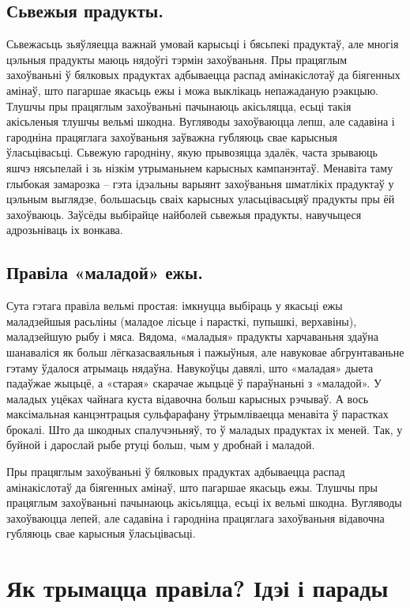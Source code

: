 \subsection{Сьвежыя прадукты.}
Сьвежасьць зьяўляецца важнай умовай карысьці і бясьпекі прадуктаў, але многія цэльныя прадукты маюць нядоўгі тэрмін захоўваньня. Пры працяглым захоўваньні ў бялковых прадуктах адбываецца распад амінакіслотаў да біягенных амінаў, што пагаршае якасьць ежы і можа выклікаць непажаданую рэакцыю. Тлушчы пры працяглым захоўваньні пачынаюць акісьляцца, есьці такія акісьленыя тлушчы вельмі шкодна. Вугляводы захоўваюцца лепш, але садавіна і гародніна працяглага захоўваньня заўважна губляюць свае карысныя ўласьцівасьці. Сьвежую гародніну, якую прывозяцца здалёк, часта зрываюць яшчэ нясьпелай і зь нізкім утрыманьнем карысных кампанэнтаў. Менавіта таму глыбокая замарозка – гэта ідэальны варыянт захоўваньня шматлікіх прадуктаў у цэльным выглядзе, большасьць сваіх карысных уласьцівасьцяў прадукты пры ёй захоўваюць. Заўсёды выбірайце найболей сьвежыя прадукты, навучыцеся адрозьніваць іх вонкава.

\subsection{Правіла «маладой» ежы.}
Сута гэтага правіла вельмі простая: імкнуцца выбіраць у якасьці ежы маладзейшыя расьліны (маладое лісьце і парасткі, пупышкі, верхавіны), маладзейшую рыбу і мяса. Вядома, «маладыя» прадукты харчаваньня здаўна шанаваліся як больш лёгказасваяльныя і пажыўныя, але навуковае абгрунтаваньне гэтаму ўдалося атрымаць нядаўна. Навукоўцы давялі, што «маладая» дыета падаўжае жыцьцё, а «старая» скарачае жыцьцё ў параўнаньні з «маладой». У маладых уцёках чайнага куста відавочна больш карысных рэчываў. А вось максімальная канцэнтрацыя сульфарафану ўтрымліваецца менавіта ў парастках брокалі. Што да шкодных спалучэньняў, то ў маладых прадуктах іх меней. Так, у буйной і дарослай рыбе ртуці больш, чым у дробнай і маладой.

Пры працяглым захоўваньні ў бялковых прадуктах адбываецца распад амінакіслотаў да біягенных амінаў, што пагаршае якасьць ежы. Тлушчы пры працяглым захоўваньні пачынаюць акісьляцца, есьці іх вельмі шкодна. Вугляводы захоўваюцца лепей, але садавіна і гародніна працяглага захоўваньня відавочна губляюць свае карысныя ўласьцівасьці.

\section{Як трымацца правіла? Ідэі і парады}

